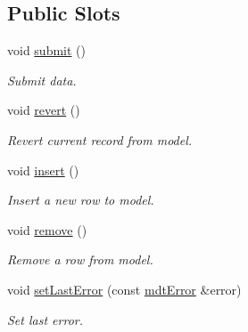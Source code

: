 \subsection*{Public Slots}
\begin{DoxyCompactItemize}
\item 
void \hyperlink{classmdt_abstract_sql_table_controller_a14f3e2a91fc30ca0e018944f4f95bc33}{submit} ()
\begin{DoxyCompactList}\small\item\em Submit data. \end{DoxyCompactList}\item 
void \hyperlink{classmdt_abstract_sql_table_controller_a36af2665b6d742aba3bc7f6ee6b2a6c4}{revert} ()
\begin{DoxyCompactList}\small\item\em Revert current record from model. \end{DoxyCompactList}\item 
void \hyperlink{classmdt_abstract_sql_table_controller_a82e88e4ff610f73b629bb6d2f229d1aa}{insert} ()
\begin{DoxyCompactList}\small\item\em Insert a new row to model. \end{DoxyCompactList}\item 
void \hyperlink{classmdt_abstract_sql_table_controller_a7bbe0f951403acbcc01c99f5916b9204}{remove} ()
\begin{DoxyCompactList}\small\item\em Remove a row from model. \end{DoxyCompactList}\item 
void \hyperlink{classmdt_abstract_sql_table_controller_a3412eef70d436bffd15f8edafce977ba}{set\-Last\-Error} (const \hyperlink{classmdt_error}{mdt\-Error} \&error)
\begin{DoxyCompactList}\small\item\em Set last error. \end{DoxyCompactList}\end{DoxyCompactItemize}
